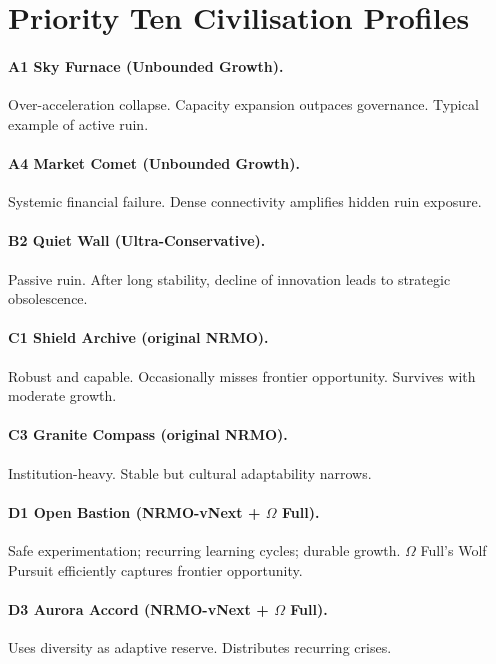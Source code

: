 \section{Priority Ten Civilisation Profiles}
\label{sec:omega-priority-profiles}

\paragraph{A1 Sky Furnace (Unbounded Growth).}
Over-acceleration collapse. Capacity expansion outpaces governance.
Typical example of active ruin.

\paragraph{A4 Market Comet (Unbounded Growth).}
Systemic financial failure. Dense connectivity amplifies hidden ruin
exposure.

\paragraph{B2 Quiet Wall (Ultra-Conservative).}
Passive ruin. After long stability, decline of innovation leads to
strategic obsolescence.

\paragraph{C1 Shield Archive (original NRMO).}
Robust and capable. Occasionally misses frontier opportunity.
Survives with moderate growth.

\paragraph{C3 Granite Compass (original NRMO).}
Institution-heavy. Stable but cultural adaptability narrows.

\paragraph{D1 Open Bastion (NRMO-vNext + $\Omega$ Full).}
Safe experimentation; recurring learning cycles; durable growth.
$\Omega$ Full's Wolf Pursuit efficiently captures frontier
opportunity.

\paragraph{D3 Aurora Accord (NRMO-vNext + $\Omega$ Full).}
Uses diversity as adaptive reserve. Distributes recurring crises.

